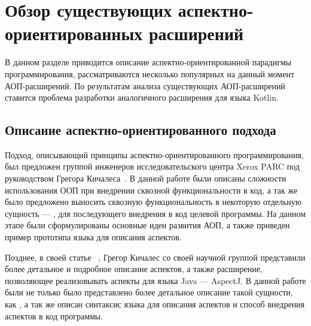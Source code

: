 \chapter{Обзор существующих аспектно-ориентированных расширений}
В данном разделе приводится описание аспектно-ориентированной парадигмы
программирования, рассматриваются несколько популярных на данный момент
АОП-расширений.
По результатам анализа существующих АОП-расширений ставится проблема разработки
аналогичного расширения для языка Kotlin.
\section{Описание аспектно-ориентированного подхода}
\label{sec:aop_description}
Подход, описывающий принципы аспектно-ориентированного программирования, был
предложен группой инженеров исследовательского центра Xerox PARC под
руководством Грегора Кичалеса~\cite{kiczales_aop}.
В данной работе были описаны сложности использования ООП при внедрении сквозной
функциональности в код, а так же было предложено выносить сквозную
функциональность в некоторую отдельную сущность --- , для
последующего внедрения в код целевой программы.
На данном этапе были сформулированы основные идеи развития АОП, а также приведен
пример прототипа языка для описания аспектов.

Позднее, в своей статье ~\cite{kiczales_aspectj},
Грегор Кичалес со своей научной группой представили более детальное и подробное
описание аспектов, а также расширение, позволяющее реализовывать аспекты для
языка Java --- AspectJ.
В данной работе были не только было представлено более детальное описание такой
сущности, как , а так же описан синтаксис языка для описания
аспектов и способ внедрения аспектов в код программы.

